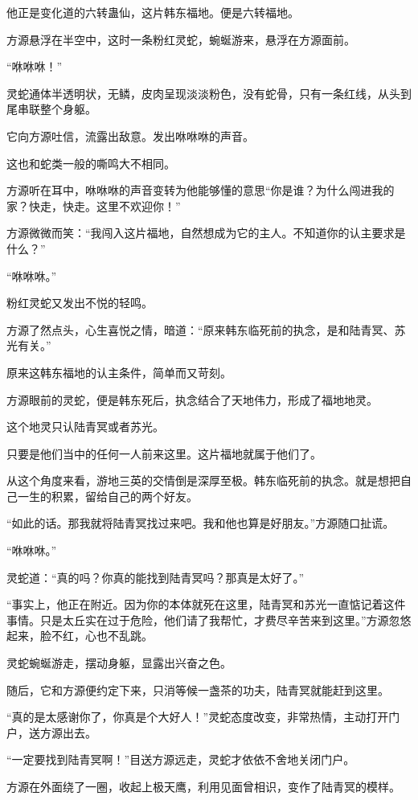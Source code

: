 \begin{this_body}
他正是变化道的六转蛊仙，这片韩东福地。便是六转福地。

方源悬浮在半空中，这时一条粉红灵蛇，蜿蜒游来，悬浮在方源面前。

“咻咻咻！”

灵蛇通体半透明状，无鳞，皮肉呈现淡淡粉色，没有蛇骨，只有一条红线，从头到尾串联整个身躯。

它向方源吐信，流露出敌意。发出咻咻咻的声音。

这也和蛇类一般的嘶鸣大不相同。

方源听在耳中，咻咻咻的声音变转为他能够懂的意思“你是谁？为什么闯进我的家？快走，快走。这里不欢迎你！”

方源微微而笑：“我闯入这片福地，自然想成为它的主人。不知道你的认主要求是什么？”

“咻咻咻。”

粉红灵蛇又发出不悦的轻鸣。

方源了然点头，心生喜悦之情，暗道：“原来韩东临死前的执念，是和陆青冥、苏光有关。”

原来这韩东福地的认主条件，简单而又苛刻。

方源眼前的灵蛇，便是韩东死后，执念结合了天地伟力，形成了福地地灵。

这个地灵只认陆青冥或者苏光。

只要是他们当中的任何一人前来这里。这片福地就属于他们了。

从这个角度来看，游地三英的交情倒是深厚至极。韩东临死前的执念。就是想把自己一生的积累，留给自己的两个好友。

“如此的话。那我就将陆青冥找过来吧。我和他也算是好朋友。”方源随口扯谎。

“咻咻咻。”

灵蛇道：“真的吗？你真的能找到陆青冥吗？那真是太好了。”

“事实上，他正在附近。因为你的本体就死在这里，陆青冥和苏光一直惦记着这件事情。只是太丘实在过于危险，他们请了我帮忙，才费尽辛苦来到这里。”方源忽悠起来，脸不红，心也不乱跳。

灵蛇蜿蜒游走，摆动身躯，显露出兴奋之色。

随后，它和方源便约定下来，只消等候一盏茶的功夫，陆青冥就能赶到这里。

“真的是太感谢你了，你真是个大好人！”灵蛇态度改变，非常热情，主动打开门户，送方源出去。

“一定要找到陆青冥啊！”目送方源远走，灵蛇才依依不舍地关闭门户。

方源在外面绕了一圈，收起上极天鹰，利用见面曾相识，变作了陆青冥的模样。


\end{this_body}
